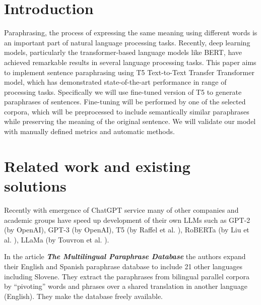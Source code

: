 \documentclass[fleqn,moreauthors,10pt]{ds_report}
\affiliation{\textit{Advisors: Slavko Žitnik}}
\begin{document}
\flushbottom 

\maketitle 

\thispagestyle{empty} 


\section*{Introduction}

Paraphrasing, the process of expressing the same meaning using different words is an important part of natural language processing tasks. Recently, deep learning models, particularly the transformer-based language models like BERT, have achieved remarkable results in several language processing tasks. This paper aims to implement sentence paraphrasing using T5 Text-to-Text Transfer Transformer model, which has demonstrated state-of-the-art performance in range of processing tasks. Specifically we will use fine-tuned version of T5 \cite{ulčar2023sequence} to generate paraphrases of sentences. Fine-tuning will be performed by one of the selected corpora, which will be preprocessed to include semantically similar paraphrases while preserving the meaning of the original sentence. We will validate our model with manually defined metrics and automatic methods. 


\section*{Related work and existing solutions}
Recently with emergence of ChatGPT service many of other companies and academic groups have speed up development of their own LLMs such as GPT-2 (by OpenAI), GPT-3 (by OpenAI), T5 (by Raffel et al. \cite{https://doi.org/10.48550/arxiv.1910.10683}), RoBERTa (by Liu et al. \cite{https://doi.org/10.48550/arxiv.1907.11692}), LLaMa (by Touvron et al. \cite{https://doi.org/10.48550/arxiv.2302.13971}).

In the article \textit{\textbf{The Multilingual Paraphrase Database}}\cite{ganitkevitch2014multilingual} the authors expand their English and Spanish paraphrase database to include 21 other languages including Slovene. They extract the paraphrases from bilingual parallel corpora by “pivoting” words and phrases over a shared translation in another language (English). They make the database freely available. 
\end{document}
